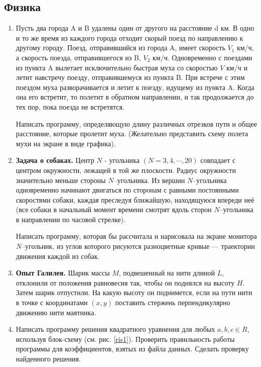 \subsection{Физика}

\begin{enumerate}

  \item Пусть два города A и B удалены один от другого на расстояние d км. В одно и то же время из каждого города отходит скорый поезд по направлению к другому городу. Поезд, отправившийся из города A, имеет скорость $V_1$ км/ч, 
а скорость поезда, отправившегося из B, $V_2$ км/ч. Одновременно с поездами из пункта A вылетает исключительно быстрая муха со скоростью $V$ км/ч и летит навстречу поезду, отправившемуся из пункта B. 
При встрече с этим поездом муха разворачивается и летит к поезду, идущему из пункта A. Когда она его встретит, то полетит в обратном направлении, и так продолжается до тех пор, пока поезда не встретятся.

Написать программу, определяющую длину различных отрез­ков пути и общее расстояние, которые пролетит муха. (Желательно представить схему полета мухи на экране в виде графика).




  \item {\bf Задача о собаках.}
Центр $N$  - угольника $(N = 3, 4,\cdots, 20)$ совпадает с центром окружности, лежащей в той же плоскости. Радиус окружности значительно меньше стороны $N$--угольника. Из вершин $N$--угольника одновременно начинают двигаться по сторонам с равными постоянными скоростями собаки, каждая преследуя ближайшую, находящуюся впереди неё (все собаки в начальный момент времени смотрят вдоль сторон $N$--угольника в направлении по часовой стрелке).

Написать программу, которая бы рассчитала и нарисовала на экране монитора $N$--угольник, из углов которого рисуются разноцветные кривые --- траектории движения каждой из собак.

  \item {\bf Опыт Галилея.}
Шарик массы $M$, подвешенный на нити длиной $L$, отклонили от положения равновесия так, чтобы он поднялся на высоту $H$. Затем шарик отпустили. На какую высоту он поднимется, если на пути нити в точке с координатами $(x, y)$ поставить стержень перпендикулярно движению нити маятника.

  \item Написать программу решения квадратного уравнения для любых $a,b,c \in R$, используя блок-схему (см. рис. \ref{ris1}). Проверить правильность работы программы для коэффициентов, взятых из файла данных. Сделать проверку найденного решения.


\end{enumerate}
